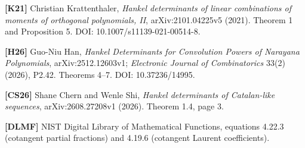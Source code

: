 \documentclass[
  11pt,
]{article}
\begin{document}
\textbf{{[}K21{]}} Christian Krattenthaler, \emph{Hankel determinants of
linear combinations of moments of orthogonal polynomials, II},
arXiv:2101.04225v5 (2021). Theorem 1 and Proposition 5. DOI:
10.1007/s11139-021-00514-8.

\textbf{{[}H26{]}} Guo-Niu Han, \emph{Hankel Determinants for
Convolution Powers of Narayana Polynomials}, arXiv:2512.12603v1;
\emph{Electronic Journal of Combinatorics} 33(2) (2026), P2.42. Theorems
4--7. DOI: 10.37236/14995.

\textbf{{[}CS26{]}} Shane Chern and Wenle Shi, \emph{Hankel determinants
of Catalan-like sequences}, arXiv:2608.27208v1 (2026). Theorem 1.4, page
3.

\textbf{{[}DLMF{]}} NIST Digital Library of Mathematical Functions,
equations 4.22.3 (cotangent partial fractions) and 4.19.6 (cotangent
Laurent coefficients).

\endgroup
\end{document}
